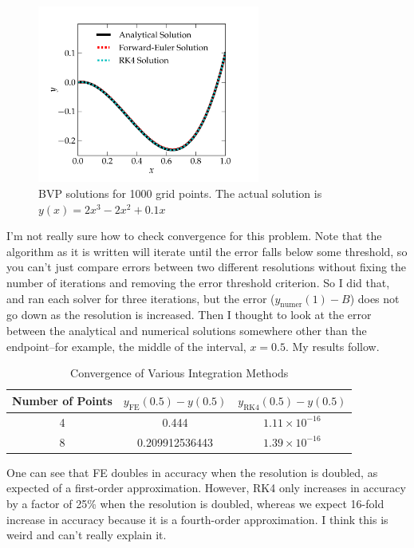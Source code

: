 \documentclass{article}
\newcommand{\ee}[1]{\times 10^{#1}}
\begin{document}
\begin{spacing}{1.1}
\begin{figure}[H]
 \centering
 \hspace{0cm} \includegraphics[width=0.65\textwidth]{fig-1000pts.pdf}
 \caption{BVP solutions for 1000 grid points. The actual solution is \(y(x) = 2x^3-2x^2+0.1x\)}
 \label{fig-problem1}
\end{figure} 

I'm not really sure how to check convergence for this problem. Note that the algorithm as it is written will iterate until the error falls below some threshold, so you can't just compare errors between two different resolutions without fixing the number of iterations and removing the error threshold criterion. So I did that, and ran each solver for three iterations, but the error (\(y_\text{numer}(1) - B\)) does not go down as the resolution is increased. Then I thought to look at the error between the analytical and numerical solutions somewhere other than the endpoint--for example, the middle of the interval, \(x=0.5\). My results follow.

\begin{table}[H]
\centering
\caption{Convergence of Various Integration Methods}
\vspace{0.25cm}
\begin{tabular}{|c|c|c|}
\hline
Number of Points & \(y_\text{FE}(0.5) - y(0.5)\) & \(y_\text{RK4}(0.5) - y(0.5)\) \\
\hline
4 & 0.444 & \(1.11\ee{-16}\)  \\
8 & 0.209912536443 & \(1.39\ee{-16}\)  \\
\hline
\end{tabular}
\end{table}

One can see that FE doubles in accuracy when the resolution is doubled, as expected of a first-order approximation. However, RK4 only increases in accuracy by a factor of 25\% when the resolution is doubled, whereas we expect 16-fold increase in accuracy because it is a fourth-order approximation. I think this is weird and can't really explain it.

\end{spacing}
\end{document}
